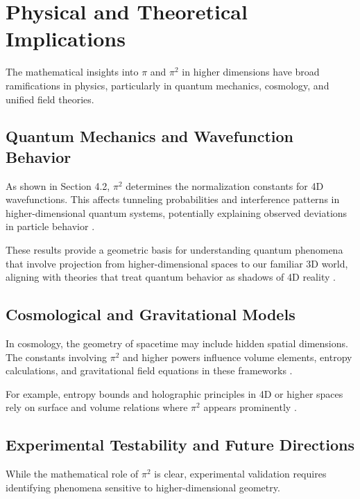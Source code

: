 \documentclass[12pt,a4paper]{article}
\begin{document}
\section{Physical and Theoretical Implications}

The mathematical insights into \(\pi\) and \(\pi^{2}\) in higher dimensions have broad ramifications in physics, particularly in quantum mechanics, cosmology, and unified field theories.

\subsection{Quantum Mechanics and Wavefunction Behavior}

As shown in Section 4.2, \(\pi^{2}\) determines the normalization constants for 4D wavefunctions. This affects tunneling probabilities and interference patterns in higher-dimensional quantum systems, potentially explaining observed deviations in particle behavior \cite{quantum-tunneling-pi}.

These results provide a geometric basis for understanding quantum phenomena that involve projection from higher-dimensional spaces to our familiar 3D world, aligning with theories that treat quantum behavior as shadows of 4D reality \cite{4d-quantum-projection}.

\subsection{Cosmological and Gravitational Models}

In cosmology, the geometry of spacetime may include hidden spatial dimensions. The constants involving \(\pi^{2}\) and higher powers influence volume elements, entropy calculations, and gravitational field equations in these frameworks \cite{cosmology-extra-dimensions}.

For example, entropy bounds and holographic principles in 4D or higher spaces rely on surface and volume relations where \(\pi^{2}\) appears prominently \cite{holographic-principle}.

\subsection{Experimental Testability and Future Directions}

While the mathematical role of \(\pi^{2}\) is clear, experimental validation requires identifying phenomena sensitive to higher-dimensional geometry.
\end{document}

